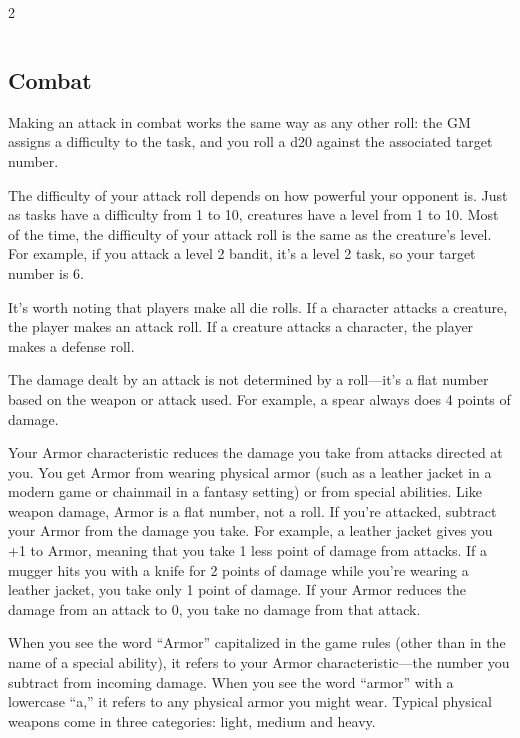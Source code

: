 \begin{multicols}{2}
\begin{table}[h!]
\begin{tabularx}{\textwidth}{| p{} | p{} | p{} | p{} |}
\end{tabularx}

\end{table}


\subsection{Combat}

Making an attack in combat works the same way as any other roll: the GM assigns a difficulty to the task, and you roll a d20 against the associated target number.

The difficulty of your attack roll depends on how powerful your opponent is. Just as tasks have a difficulty from 1 to 10, creatures have a level from 1 to 10. Most of the time, the difficulty of your attack roll is the same as the creature’s level. For example, if you attack a level 2 bandit, it’s a level 2 task, so your target number is 6.

It’s worth noting that players make all die rolls. If a character attacks a creature, the player makes an attack roll. If a creature attacks a character, the player makes a defense roll.

The damage dealt by an attack is not determined by a roll—it’s a flat number based on the weapon or attack used. For example, a spear always does 4 points of damage.

Your Armor characteristic reduces the damage you take from attacks directed at you. You get Armor from wearing physical armor (such as a leather jacket in a modern game or chainmail in a fantasy setting) or from special abilities. Like weapon damage, Armor is a flat number, not a roll. If you’re attacked, subtract your Armor from the damage you take. For example, a leather jacket gives you +1 to Armor, meaning that you take 1 less point of damage from attacks. If a mugger hits you with a knife for 2 points of damage while you’re wearing a leather jacket, you take only 1 point of damage. If your Armor reduces the damage from an attack to 0, you take no damage from that attack.

When you see the word “Armor” capitalized in the game rules (other than in the name of a special ability), it refers to your Armor characteristic—the number you subtract from incoming damage. When you see the word “armor” with a lowercase “a,” it refers to any physical armor you might wear.
Typical physical weapons come in three categories: light, medium and heavy.


\end{multicols}
